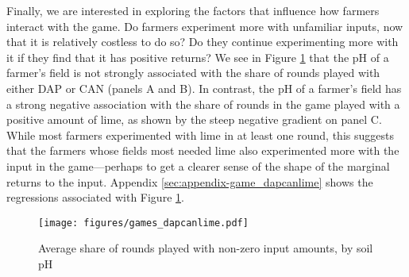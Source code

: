 \documentclass[12pt,letterpaper]{article}
\begin{document}
Finally, we are interested in exploring the factors that influence how farmers interact with the game. Do farmers experiment more with unfamiliar inputs, now that it is relatively costless to do so? Do they continue experimenting more with it if they find that it has positive returns? We see in Figure \ref{fig:games_dapcanlime} that the pH of a farmer's field is not strongly associated with the share of rounds played with either DAP or CAN (panels A and B). In contrast, the pH of a farmer's field has a strong negative association with the share of rounds in the game played with a positive amount of lime, as shown by the steep negative gradient on panel C. While most farmers experimented with lime in at least one round, this suggests that the farmers whose fields most needed lime also experimented more with the input in the game---perhaps to get a clearer sense of the shape of the marginal returns to the input. Appendix \ref{sec:appendix-game_dapcanlime} shows the regressions associated with Figure \ref{fig:games_dapcanlime}.

\begin{figure} [htbp]
\caption{Average share of rounds played with non-zero input amounts, by soil pH} 
\label{fig:games_dapcanlime}
\hspace{-.5cm} \centerline{\texttt{[image: figures/games\_dapcanlime.pdf]}}
 \end{figure}


% 
\end{document}
